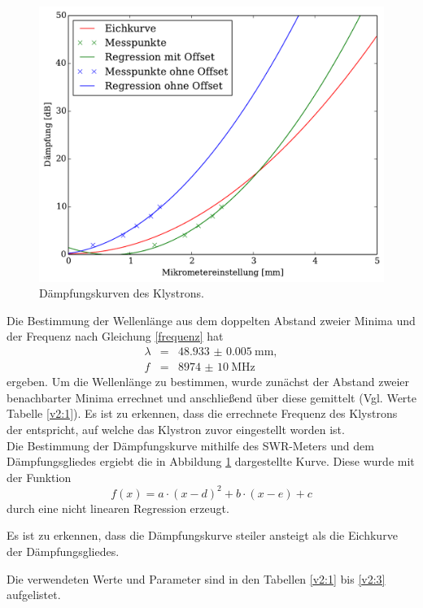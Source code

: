 \begin{figure}
	\includegraphics[width = 14cm]{pic/Daempfung.pdf}
	\caption[]{Dämpfungskurven des Klystrons.}
	\label{daempf}
\end{figure}

Die Bestimmung der Wellenlänge aus dem doppelten Abstand zweier Minima und der Frequenz nach Gleichung \eqref{frequenz} hat
\begin{eqnarray}
	\lambda &=& \SI{48.933(5)}{\milli\meter},\\
	f &=& \SI{8974(10)}{\mega\hertz}
\end{eqnarray}
ergeben.
Um die Wellenlänge zu bestimmen, wurde zunächst der Abstand zweier benachbarter Minima errechnet und anschließend über diese gemittelt (Vgl. Werte Tabelle \ref{v2:1}).
Es ist zu erkennen, dass die errechnete Frequenz des Klystrons der entspricht, auf welche das Klystron zuvor eingestellt worden ist.\\

Die Bestimmung der Dämpfungskurve mithilfe des SWR-Meters und dem Dämpfungsgliedes ergiebt die in Abbildung \ref{daempf} dargestellte Kurve.
Diese wurde mit der Funktion
\begin{equation}
	f(x)=a \cdot (x-d)^2 + b \cdot (x-e) + c
\end{equation}
 durch eine nicht linearen Regression erzeugt.

Es ist zu erkennen, dass die Dämpfungskurve steiler ansteigt als die Eichkurve der Dämpfungsgliedes.

Die verwendeten Werte und Parameter sind in den Tabellen \ref{v2:1} bis \ref{v2:3} aufgelistet.

